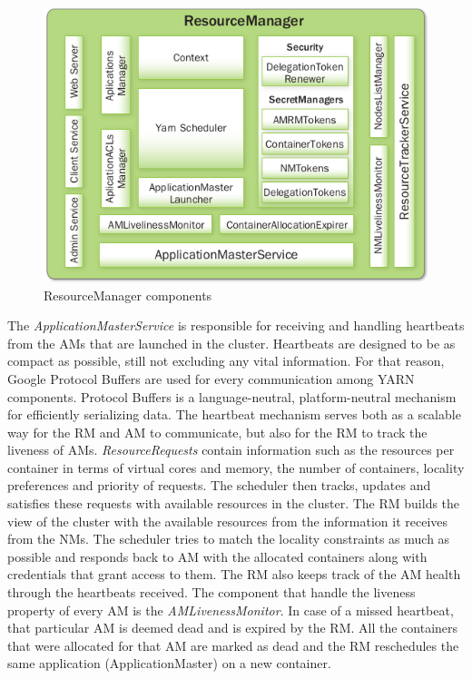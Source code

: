 \begin{figure}
\centering
\includegraphics[scale=0.6]{resources/images/Background/RM_components.png}
\caption{ResourceManager components \cite{Murthy:2014:AHY:2636998}}
\label{fig:yarn_RM_components}
\end{figure}

The \emph{ApplicationMasterService} is responsible for receiving and
handling heartbeats from the AMs that are launched in the
cluster. Heartbeats are designed to be as compact as possible, still
not excluding any vital information. For that reason, Google Protocol
Buffers \cite{proto_buf} are used for every communication among YARN
components. Protocol Buffers is a language-neutral, platform-neutral
mechanism for efficiently serializing data. The heartbeat mechanism
serves both as a scalable way for the RM and AM to communicate, but
also for the RM to track the liveness of AMs. \emph{ResourceRequests}
contain information such as the resources per container in terms of
virtual cores and memory, the number of containers, locality
preferences and priority of requests. The scheduler then tracks,
updates and satisfies these requests with available resources in the
cluster. The RM builds the view of the cluster with the available
resources from the information it receives from the NMs. The scheduler
tries to match the locality constraints as much as possible and
responds back to AM with the allocated containers along with
credentials that grant access to them. The RM also keeps track of the
AM health through the heartbeats received. The component that handle
the liveness property of every AM is the \emph{AMLivenessMonitor}. In
case of a missed heartbeat, that particular AM is deemed dead and
is expired by the RM. All the containers that were allocated for
that AM are marked as dead and the RM reschedules the same application
(ApplicationMaster) on a new container.


